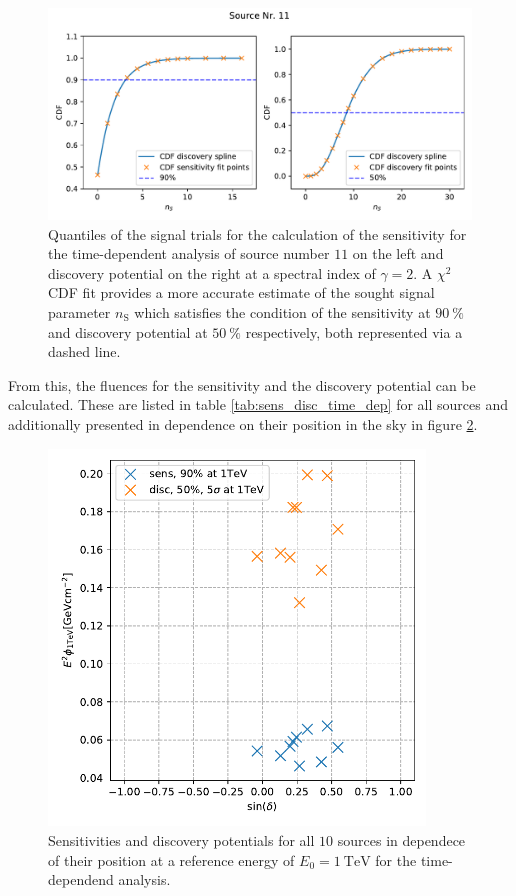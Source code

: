 \begin{figure}
    \centering
    \includegraphics[width=\linewidth]{Plots/05_csky/9_years_gfu_gold_time_dep_cdf_1.pdf}
    \caption{Quantiles of the signal trials for the calculation of the sensitivity for the time-dependent analysis of source number $\num{11}$ on the left and discovery potential on the right at a spectral index of $\gamma=\num{2}$. A $\chi^2$ CDF fit provides a more accurate estimate of the sought signal parameter $n_\text{S}$ which satisfies the condition of the sensitivity at $\SI{90}{\percent}$ and discovery potential at $\SI{50}{\percent}$ respectively, both represented via a dashed line.}
    \label{fig:time_dep_cdf_sens_disc_1}
\end{figure}
From this, the fluences for the sensitivity and the discovery potential can be calculated. These are listed in table \ref{tab:sens_disc_time_dep} for all sources and additionally presented in dependence on their position in the sky in figure \ref{fig:sens_disc_time_dep}.
\begin{figure}
    \centering
    \includegraphics[width=10cm]{Plots/05_csky/time_dep_sens_disc_dec.pdf}
    \caption{Sensitivities and discovery potentials for all $\num{10}$ sources in dependece of their position at a reference energy of $E_0 = \SI{1}{\tera\electronvolt}$ for the time-dependend analysis.}
    \label{fig:sens_disc_time_dep}
\end{figure}
